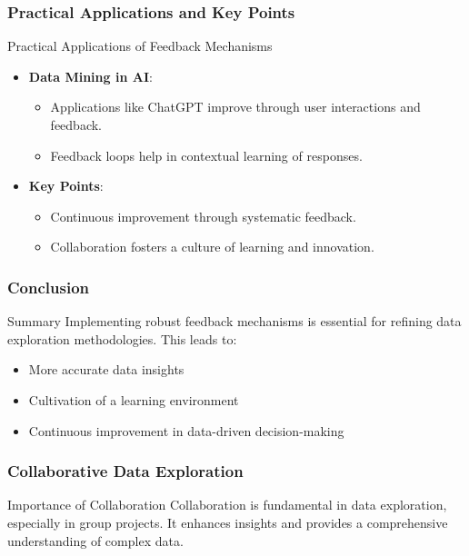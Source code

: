\documentclass[aspectratio=169]{beamer}
\begin{document}
\begin{frame}[fragile]
    \frametitle{Practical Applications and Key Points}
    \begin{block}{Practical Applications of Feedback Mechanisms}
        \begin{itemize}
            \item \textbf{Data Mining in AI}:
            \begin{itemize}
                \item Applications like ChatGPT improve through user interactions and feedback.
                \item Feedback loops help in contextual learning of responses.
            \end{itemize}
        \end{itemize}
    \end{block}
    \begin{itemize}
        \item \textbf{Key Points}:
        \begin{itemize}
            \item Continuous improvement through systematic feedback.
            \item Collaboration fosters a culture of learning and innovation.
        \end{itemize}
    \end{itemize}
\end{frame}

\begin{frame}[fragile]
    \frametitle{Conclusion}
    \begin{block}{Summary}
        Implementing robust feedback mechanisms is essential for refining data exploration methodologies. This leads to:
        \begin{itemize}
            \item More accurate data insights
            \item Cultivation of a learning environment
            \item Continuous improvement in data-driven decision-making
        \end{itemize}
    \end{block}
\end{frame}

\begin{frame}[fragile]
    \frametitle{Collaborative Data Exploration}
    \begin{block}{Importance of Collaboration}
        Collaboration is fundamental in data exploration, especially in group projects. 
        It enhances insights and provides a comprehensive understanding of complex data.
    \end{block}
\end{frame}
\end{document}
